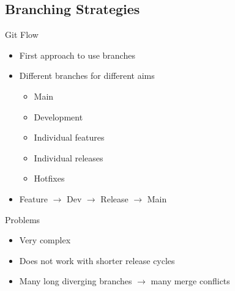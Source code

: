 \begin{frame}{\insertsubsection}
\begin{fancycolumns}[animation=none]
\begin{center}
		\pause
				
		\end{center}
	\end{fancycolumns}
\end{frame}


\subsection{Branching Strategies}
\begin{frame}{\insertsubsection {}}
	\begin{fancycolumns}[animation=none]
		\begin{definition}{Git Flow}
			\begin{itemize}
				\item First approach to use branches
				\item Different branches for different aims
				\begin{itemize}
					\item Main
					\item Development
					\item Individual features
					\item Individual releases
					\item Hotfixes
				\end{itemize}
				\item Feature $\rightarrow$ Dev $\rightarrow$ Release $\rightarrow$ Main
			\end{itemize}
		\end{definition}\pause
		\begin{note}{Problems}
			\begin{itemize}
				\item Very complex
				\item Does not work with shorter release cycles
				\item Many long diverging branches $\rightarrow$ many merge conflicts
			\end{itemize}
		\end{note}
		\nextcolumn
	\end{fancycolumns}
\end{frame}

